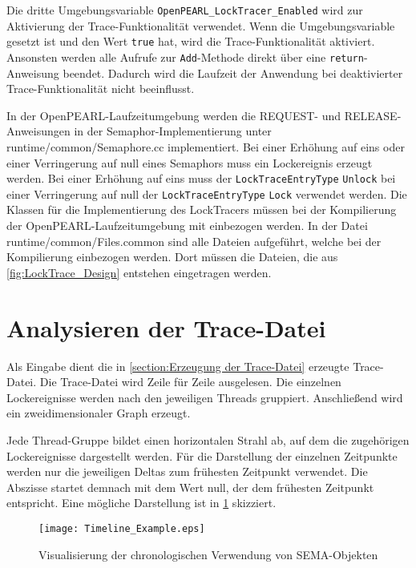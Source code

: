 Die dritte Umgebungsvariable \texttt{OpenPEARL\_LockTracer\_Enabled} wird zur
Aktivierung der Trace-Funktionalität verwendet. Wenn die Umgebungsvariable
gesetzt ist und den Wert \texttt{true} hat, wird die Trace-Funktionalität
aktiviert. Ansonsten werden alle Aufrufe zur \texttt{Add}-Methode direkt über
eine \texttt{return}-Anweisung beendet. Dadurch wird die Laufzeit der Anwendung
bei deaktivierter Trace-Funktionalität nicht beeinflusst.

In der OpenPEARL-Laufzeitumgebung werden die \textrm{REQUEST}- und
\textrm{RELEASE}-Anweisungen in der Semaphor-Implementierung unter
runtime/common/Semaphore.cc implementiert. Bei einer Erhöhung auf eins oder
einer Verringerung auf null eines Semaphors muss ein Lockereignis erzeugt
werden. Bei einer Erhöhung auf eins muss der \texttt{Lock\-Trace\-Entry\-Type}
\texttt{Unlock} bei einer Verringerung auf null der
\texttt{Lock\-Trace\-Entry\-Type} \texttt{Lock} verwendet werden. Die Klassen
für die Implementierung des LockTracers müssen bei der Kompilierung der
OpenPEARL-Laufzeitumgebung mit einbezogen werden. In der Datei
runtime/common/Files.common sind alle Dateien aufgeführt, welche bei der
Kompilierung einbezogen werden. Dort müssen die Dateien, die aus
\cref{fig:LockTrace_Design} entstehen eingetragen werden.

\section{Analysieren der Trace-Datei}
\label{section:Analysieren der Trace-Datei}
Als Eingabe dient die in \cref{section:Erzeugung der Trace-Datei} erzeugte
Trace-Datei. Die Trace-Datei wird Zeile für Zeile ausgelesen. Die einzelnen
Lockereignisse werden nach den jeweiligen Threads gruppiert. Anschließend wird
ein zweidimensionaler Graph erzeugt.

Jede Thread-Gruppe bildet einen horizontalen Strahl ab, auf dem die zugehörigen
Lockereignisse dargestellt werden. Für die Darstellung der einzelnen Zeitpunkte
werden nur die jeweiligen Deltas zum frühesten Zeitpunkt verwendet. Die Abszisse
startet demnach mit dem Wert null, der dem frühesten Zeitpunkt entspricht. Eine
mögliche Darstellung ist in \cref{fig:Timeline_Example} skizziert.
\begin{figure}[ht]
  \texttt{[image: Timeline\_Example.eps]}
  \caption{Visualisierung der chronologischen Verwendung von \textrm{SEMA}-Objekten}
  \label{fig:Timeline_Example}
\end{figure}

